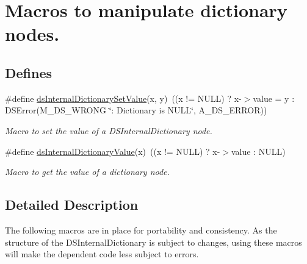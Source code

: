 \hypertarget{group___d_s___d_i_c_t_i_o_n_a_r_y___a_c_c_e_s_s_o_r_y}{
\section{Macros to manipulate dictionary nodes.}
\label{group___d_s___d_i_c_t_i_o_n_a_r_y___a_c_c_e_s_s_o_r_y}
}
\subsection*{Defines}
\begin{DoxyCompactItemize}
\item 
\#define \hyperlink{group___d_s___d_i_c_t_i_o_n_a_r_y___a_c_c_e_s_s_o_r_y_gafb8150844a937da605ec4aa474c4ccaa}{dsInternalDictionarySetValue}(x, y)~((x != NULL) ? x-\/$>$value = y : DSError(M\_\-DS\_\-WRONG \char`\"{}: Dictionary is NULL\char`\"{}, A\_\-DS\_\-ERROR))
\begin{DoxyCompactList}\small\item\em Macro to set the value of a DSInternalDictionary node. \item\end{DoxyCompactList}\item 
\#define \hyperlink{group___d_s___d_i_c_t_i_o_n_a_r_y___a_c_c_e_s_s_o_r_y_gab41d65e77a69ffe5fb577a042ab73cdc}{dsInternalDictionaryValue}(x)~((x != NULL) ? x-\/$>$value : NULL)
\begin{DoxyCompactList}\small\item\em Macro to get the value of a dictionary node. \item\end{DoxyCompactList}\end{DoxyCompactItemize}


\subsection{Detailed Description}
The following macros are in place for portability and consistency. As the structure of the DSInternalDictionary is subject to changes, using these macros will make the dependent code less subject to errors. 

